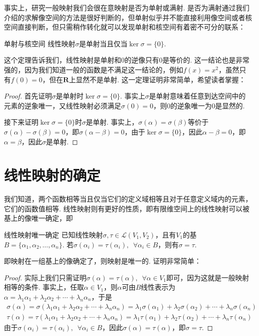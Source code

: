 事实上，研究一般映射我们会很在意映射是否为单射或满射. 是否为满射通过我们介绍的求解像空间的方法是很好判断的，但单射似乎并不能直接利用像空间或者核空间直接判断，但只需稍作转化就可以发现单射和核空间有着密不可分的联系：
\begin{theorem}{}{单射与核空间}
    线性映射$\sigma$是单射当且仅当$\ker \sigma=\{0\}$.
\end{theorem}
这个定理告诉我们，线性映射是单射和0的逆像只有0是等价的. 这一结论也是非常强的，因为我们知道一般的函数是不满足这一结论的，例如$f(x)=x^2$，虽然只有$f(0)=0$，但在$\mathbf{R}$上显然不是单射. 这一定理证明非常简单，希望读者掌握：

\begin{proof}
    首先证明$\sigma$是单射时$\ker\sigma=\{0\}$. 事实上$\sigma$是单射意味着任意到达空间中的元素的逆象唯一，又线性映射必须满足$\sigma(0)=0$，则0的逆象唯一为0是显然的.

    接下来证明$\ker \sigma=\{0\}$时$\sigma$是单射. 事实上，$\sigma(\alpha)=\sigma(\beta)$等价于$\sigma(\alpha)-\sigma(\beta)=0$，即$\sigma(\alpha-\beta)=0$，由于$\ker \sigma=\{0\}$，因此$\alpha-\beta=0$，即$\alpha=\beta$，因此$\sigma$是单射.
\end{proof}

\section{线性映射的确定}

我们知道，两个函数相等当且仅当它们的定义域相等且对于任意定义域内的元素，它们的函数值相等. 线性映射则有更好的性质，即有限维空间上的线性映射可以被基上的像唯一确定，即
\begin{theorem}{}{线性映射唯一确定}
    已知线性映射$\sigma,\tau\in \mathcal{L}(V_1,V_2)$，且有$V_1$的基$B=\{\alpha_1,\alpha_2,\ldots,\alpha_n\}$. 若$\sigma(\alpha_i)=\tau(\alpha_i),\enspace\forall \alpha_i \in B$，则有$\sigma=\tau$.
\end{theorem}
即映射在一组基上的像确定了，则映射是唯一的. 证明非常简单：

\begin{proof}
    实际上我们只需证明$\sigma(\alpha)=\tau(\alpha),\enspace\forall \alpha \in V_1$即可，因为这就是一般映射相等的条件. 事实上，任取$\alpha \in V_1$，则$\alpha$可由$B$线性表示为$\alpha=\lambda_1\alpha_1+\lambda_2\alpha_2+\cdots+\lambda_n\alpha_n$，于是
    \begin{gather*}
        \sigma(\alpha)=\sigma(\lambda_1\alpha_1+\lambda_2\alpha_2+\cdots+\lambda_n\alpha_n)=\lambda_1\sigma(\alpha_1)+\lambda_2\sigma(\alpha_2)+\cdots+\lambda_n\sigma(\alpha_n) \\
        \tau(\alpha)=\tau(\lambda_1\alpha_1+\lambda_2\alpha_2+\cdots+\lambda_n\alpha_n)=\lambda_1\tau(\alpha_1)+\lambda_2\tau(\alpha_2)+\cdots+\lambda_n\tau(\alpha_n)
    \end{gather*}
    由于$\sigma(\alpha_i)=\tau(\alpha_i),\enspace\forall \alpha_i \in B$，因此$\sigma(\alpha)=\tau(\alpha)$，即$\sigma=\tau$.
\end{proof}

